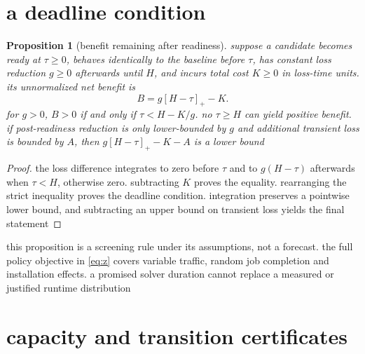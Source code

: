 \documentclass[11pt,a4paper]{article}
\newtheorem{proposition}[theorem]{Proposition}
\newcommand{\1}{\mathbf{1}}
\newcommand{\pos}[1]{\left[#1\right]_+}
\begin{document}
\section{a deadline condition}
\begin{proposition}[benefit remaining after readiness]\label{prop:deadline}
suppose a candidate becomes ready at $\tau\ge0$, behaves identically to the baseline before $\tau$, has constant loss reduction $g\ge0$ afterwards until $H$, and incurs total cost $K\ge0$ in loss-time units. its unnormalized net benefit is
\begin{equation}
 B=g\pos{H-\tau}-K.\label{eq:deadline}
\end{equation}
for $g>0$, $B>0$ if and only if $\tau<H-K/g$. no $\tau\ge H$ can yield positive benefit. if post-readiness reduction is only lower-bounded by $g$ and additional transient loss is bounded by $A$, then $g\pos{H-\tau}-K-A$ is a lower bound
\end{proposition}
\begin{proof}
the loss difference integrates to zero before $\tau$ and to $g(H-\tau)$ afterwards when $\tau<H$, otherwise zero. subtracting $K$ proves the equality. rearranging the strict inequality proves the deadline condition. integration preserves a pointwise lower bound, and subtracting an upper bound on transient loss yields the final statement
\end{proof}
this proposition is a screening rule under its assumptions, not a forecast. the full policy objective in \eqref{eq:z} covers variable traffic, random job completion and installation effects. a promised solver duration cannot replace a measured or justified runtime distribution

\section{capacity and transition certificates}
\end{document}

